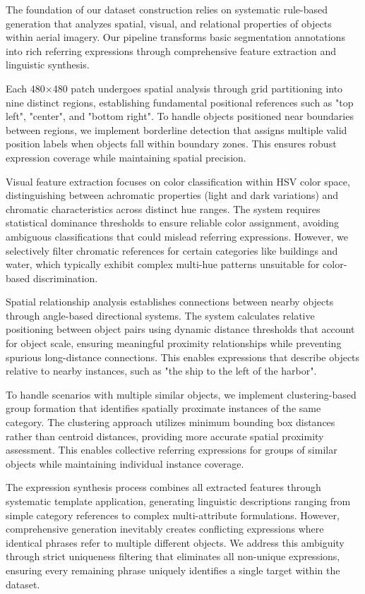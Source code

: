 The foundation of our dataset construction relies on systematic rule-based generation that analyzes spatial, visual, and relational properties of objects within aerial imagery. Our pipeline transforms basic segmentation annotations into rich referring expressions through comprehensive feature extraction and linguistic synthesis.

Each 480×480 patch undergoes spatial analysis through grid partitioning into nine distinct regions, establishing fundamental positional references such as "top left", "center", and "bottom right". To handle objects positioned near boundaries between regions, we implement borderline detection that assigns multiple valid position labels when objects fall within boundary zones. This ensures robust expression coverage while maintaining spatial precision.

Visual feature extraction focuses on color classification within HSV color space, distinguishing between achromatic properties (light and dark variations) and chromatic characteristics across distinct hue ranges. The system requires statistical dominance thresholds to ensure reliable color assignment, avoiding ambiguous classifications that could mislead referring expressions. However, we selectively filter chromatic references for certain categories like buildings and water, which typically exhibit complex multi-hue patterns unsuitable for color-based discrimination.

Spatial relationship analysis establishes connections between nearby objects through angle-based directional systems. The system calculates relative positioning between object pairs using dynamic distance thresholds that account for object scale, ensuring meaningful proximity relationships while preventing spurious long-distance connections. This enables expressions that describe objects relative to nearby instances, such as "the ship to the left of the harbor".

To handle scenarios with multiple similar objects, we implement clustering-based group formation that identifies spatially proximate instances of the same category. The clustering approach utilizes minimum bounding box distances rather than centroid distances, providing more accurate spatial proximity assessment. This enables collective referring expressions for groups of similar objects while maintaining individual instance coverage.

The expression synthesis process combines all extracted features through systematic template application, generating linguistic descriptions ranging from simple category references to complex multi-attribute formulations. However, comprehensive generation inevitably creates conflicting expressions where identical phrases refer to multiple different objects. We address this ambiguity through strict uniqueness filtering that eliminates all non-unique expressions, ensuring every remaining phrase uniquely identifies a single target within the dataset.

